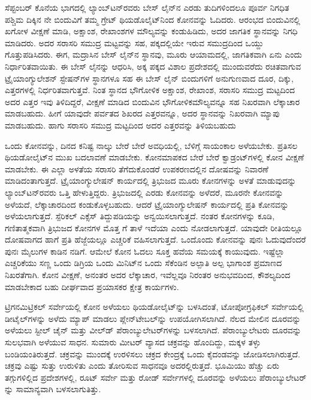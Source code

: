 ಸೆಪ್ಟಂಬರ್​ ಕೊನೆಯ ಭಾಗದಲ್ಲಿ ಲ್ಯಾಂಬ್​ಟನ್​ರವರು ಬೇಸ್​ ಲೈನ್​ನ ಎರಡು ತುದಿಗಳಿಂದಲೂ ಪೂರ್ವ ನಿಗಧಿತ ಪಶ್ಚಿಮ ದಿಕ್ಕಿನ ನೇ ಬಿಂದುವಿಗೆ ತಮ್ಮ ಗ್ರೇಟ್​ ಥಿಯಡೊಲೈಟ್​\break ನಿಂದ ಕೋನವನ್ನು ಓದಿದರು. ಆರಂಭದ ಬಿಂದುವಿನಲ್ಲಿ ಖಗೋಳ ವೀಕ್ಷಣೆ ಮಾಡಿ, ಅಕ್ಷಾಂಶ, ರೇಖಾಂಶಗಳ ಮೌಲ್ಯವನ್ನು ಕಂಡುಹಿಡಿದು, ಅದರ ಜಾಗತಿಕ ಸ್ಥಾನವನ್ನು ನಿಗಧಿ ಮಾಡಿದರು. ಅದರ ಸರಾಸರಿ ಸಮುದ್ರ ಮಟ್ಟವನ್ನು ಸಹ, ಪಕ್ಕದಲ್ಲಿಯೇ ಇರುವ ಸಮುದ್ರದಿಂದ ಒಯ್ದು ಗೊತ್ತುಪಡಿಸಿದರು. ಈಗ, ಮದ್ರಾಸಿನ ಬೇಸ್​ ಲೈನ್​ನ ಸ್ಥಾನವು, ಮೂರು ಆಯಾಮದಲ್ಲಿ, ಜಾಗತಿಕವಾಗಿ ಏನು ಎಂದು ನಿರ್ಧಾರಿತವಾಯಿತು. ಈ ಬೇಸ್​ ಲೈನನ್ನು ಆಧರಿಸಿ, ಅಕ್ಕ ಪಕ್ಕದ ವಿಶಾಲ ಪ್ರದೇಶದಲ್ಲಿ ಮುಂದುವರೆದು ರಚಿತವಾಗುವ ಟ್ರೈಯಾಂಗ್ಯುಲೇಶನ್​ ಸ್ಟೇಷನ್​ಗಳ ಸ್ಥಾನಗಳೂ ಸಹ ಈ ಬೇಸ್​ ಲೈನ್​ ಬಿಂದುಗಳಿಗೆ ಅನುಗುಣವಾದ ದೂರ, ದಿಕ್ಕು, ಎತ್ತರಗಳಲ್ಲಿ ನಿರ್ಧರಿತವಾಗುತ್ತವೆ. ನಿಂತ ಸ್ಥಾನದ ಭೌಗೋಳಿಕ ಅಕ್ಷಾಂಶ, ರೇಖಾಂಶ, ಸರಾಸರಿ ಸಮುದ್ರ ಮಟ್ಟದಿಂದ ಅದರ ಎತ್ತರ ಇವು ತಿಳಿದಿದ್ದರೆ, ವೀಕ್ಷಣೆ ಮಾಡಿದ ಬಿಂದುವಿನ ಭೌಗೋಳಿಕ\break ಮೌಲ್ಯವನ್ನೂ ಸಹ ನಿಖರವಾಗಿ ಲೆಕ್ಕಾಚಾರ ಮಾಡಬಹುದು. ಹೀಗೆ ಯಾವುದೇ ಪರ್ವತದ ಶಿಖರದ ಎತ್ತರವನ್ನೂ, ಅದರ ಸ್ಥಾನವನ್ನು ನಿಖರವಾಗಿ ಮ್ಯಾಪು ಮಾಡಬಹುದು. ಹಾಗು ಸರಾಸರಿ ಸಮುದ್ರ ಮಟ್ಟದಿಂದ ಅದರ ಎತ್ತರವನ್ನು ತಿಳಿಯಬಹುದು

\vskip 4pt

ಒಂದು ಕೋನವನ್ನು, ದಿನದ ಕನಿಷ್ಟ ನಾಲ್ಕು ಬೇರೆ ಬೇರೆ ಅವಧಿಯಲ್ಲಿ, ಬೆಳಿಗ್ಗೆ ಸಾಯಂಕಾಲ ಅಳೆಯಬೇಕು. ಪ್ರತಿಸಲ ಥಿಯಡೋಲೈಟ್​ನ ಮುಖ ಬದಲಾವಣೆ ಮಾಡಬೇಕು. ಕೋನಮಾಪಕದ ಬೇರೆ ಬೇರೆ ಕ್ವಾಡ್ರಂಟ್​ಗಳಲ್ಲಿ ಕೋನ ವೀಕ್ಷಣೆ ಮಾಡಬೇಕು. ಈ ಎಲ್ಲಾ ಅಳತೆಯ ಸರಾಸರಿ ತೆಗೆದುಕೊಂಡರೆ ಉಪಕರಣದಲ್ಲಿನ ದೋಷವನ್ನು ನಿವಾರಣೆ ಮಾಡಿದಂತಾಗುತ್ತದೆ. ಟ್ರೈಯಾಂಗ್ಯುಲೇಷನ್​ ಕಾರ್ಯದಲ್ಲಿ ತ್ರಿಭುಜದ ಮೂರು ಕೋನಗಳನ್ನು ಅಳತೆ ಮಾಡುವುದನ್ನು ಲ್ಯಾಂಬ್​ಟನ್​ರವರು ಒತ್ತಿ ಹೇಳುತ್ತಿದ್ದರು. ತ್ರಿಭುಜದಲ್ಲಿ ಎರಡು ಕೋನವನ್ನು ಅಳೆದರೆ, ಮೂರನೇ ಕೋನವನ್ನು ಅಳೆಯದೆ, ಲೆಕ್ಕಾಚಾರದಿಂದ ಕಂಡುಕೊಳ್ಳಬಹುದು. ಆದರೆ ಟ್ರೈಯಾಂಗ್ಯುಲೇಷನ್​ ಕಾರ್ಯದಲ್ಲಿ ಪ್ರತಿ ಕೋನವನ್ನು ಅಳೆಯಲಾಗುತ್ತದೆ. ಸ್ಪೆರಿಕಲ್​ ಎಕ್ಸೆಸ್​ ತಿದ್ದುಪಡಿಯನ್ನು ಅನ್ವಯಿಸಲಾಗುತ್ತದೆ. ನಂತರ  ಕೋನಗಳನ್ನು ಕೂಡಿ, ಗಣಿತಾತ್ಮಕವಾಗಿ ತ್ರಿಭುಜದ  ಕೋನಗಳ ಮೊತ್ತ  ಗೆ ತಾಳೆ ಇದೆಯಾ ಎಂದು ನೋಡಲಾಗುತ್ತದೆ. ಯಾವುದೇ ರೀತಿಯಲ್ಲೂ ದೋಷವಾಗದ ಹಾಗೆ ಪ್ರತಿ ಹೆಜ್ಜೆಯಲ್ಲೂ ಎಚ್ಚರಿಕೆ ವಹಿಸಲಾಗುತ್ತದೆ. ಒಂದೊಂದು ಕೋನವನ್ನು ಪುನಃ ಓದುವುದೆಂದರೆ ಪುನಃ  ಮೈಲುಗಳ ಕಾಡಿನ ನಡಿಗೆ. ಆಮೇಲೆ ಕೋನ ಓದಲು ಸೂಕ್ತ ಹವೆಯ ಸಮಯಕ್ಕೆ ಕಾಯುವುದು. ಇಷ್ಟೆಲ್ಲಾ ಎಚ್ಚರಿಕೆಯು ಸಣ್ಣ ಒಂದು ಡಿಗ್ರಿಯ ಒಂದು ಮಿನಿಟ್​ನ ಒಂದು ಸೆಕೆಂಡಿನ ಅಲ್ಪಾತಿ ಅಲ್ಪ ಭಾಗಾಂಶ ಪ್ರಮಾಣದ ನಿಖರತೆಗಾಗಿ. ಕೋನ ವೀಕ್ಷಣೆ, ಅನಂತರ ಅದರ ಲೆಕ್ಕಾಚಾರ, ಇವೆಲ್ಲವೂ ನಿರಂತರ ಅನುಭವದಿಂದ, ಕೌಶಲ್ಯದಿಂದ ಮಾಡಬೇಕಾದ ಬಹು ದೀರ್ಘವಾದ ಪ್ರಯಾಸಕರ ಕ್ಷೇತ್ರ ಕಾರ್ಯಗಳು.

\newpage

ಟ್ರಿಗನಮಿಟ್ರಿಕಲ್​ ಸರ್ವೇಯಲ್ಲಿ ಕೋನ ಅಳೆಯಲು ಥಿಯಡೋಲೈಟ್​ನ್ನು ಬಳಸಿದಂತೆ, ಟೋಪೋಗ್ರಫಿಕಲ್​ ಸರ್ವೇಯಲ್ಲಿ ಡೀಟೈಲ್​ಗಳನ್ನು ಅಳೆದು ಮ್ಯಾಪ್​ ಮಾಡಲು ಪ್ಲೇನ್​\break ಟೇಬಲ್​ನ್ನು ಉಪಯೋಗಿಸಲಾಗಿದೆ. ನೆಲದ ಮೇಲಿನ ದೂರವನ್ನು ಅಳೆಯಲು ಸ್ಟೀಲ್​ ಚೈನ್​ ಮತ್ತು ವೀಲ್​ಡ್​ ಪೆರಾಂಬ್ಯುಲೇಟರ್​ಗಳನ್ನು ಬಳಸಲಾಗಿದೆ. ಪೆರಾಂಬ್ಯುಲೇಟರು ದೂರವನ್ನು ಸುಲಭವಾಗಿ ಅಳೆಯುವ ಸಾಧನ. ಸುಮಾರು  ಮೀಟರ್​ ವ್ಯಾಸದ ಚಕ್ರವನ್ನು ಹೊಂದಿದ್ದು, ಮಕ್ಕಳ ತಳ್ಳು ಬಂಡಿಯಂತಿರುತ್ತದೆ. ಚಕ್ರವನ್ನು ಮುಂದಕ್ಕೆ ಉರಳಿಸಲು ಚಕ್ರದ ಕೇಂದ್ರಕ್ಕೆ ಒಂದು ಕೈದಂಡವನ್ನು ಜೋಡಿಸಲಾಗಿರುತ್ತದೆ. ಚಕ್ರವು ಎಷ್ಟು ಸುತ್ತು ಉರುಳಿತು ಎಂದು ತೋರಿಸುವ ಸಾಧನವೂ ಅದರಲ್ಲಿರುತ್ತದೆ. ಭೂಮಿಯು ಹೆಚ್ಚು ಏರು ತಗ್ಗುಗಳಿಲ್ಲಿದ ಪ್ರದೇಶಗಳಲ್ಲಿ, ರೂಟ್​ ಸರ್ವೇ ಮತ್ತು ರೋಡ್​ ಸರ್ವೇಗಳಲ್ಲಿ ದೂರವನ್ನು ಅಳೆಯಲು ಪೆರಾಂಬ್ಯುಲೇಟರ್​ನ್ನು ಸಾಮಾನ್ಯವಾಗಿ ಬಳಸಲಾಗುತಿತ್ತು.

